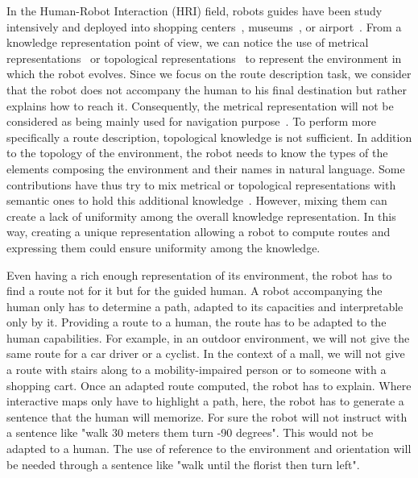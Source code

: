 In the Human-Robot Interaction (HRI) field, robots guides have been study intensively and deployed into shopping centers~\cite{okuno_2009_providing}, museums~\cite{burgard_1999_museum, clodic_2006_rackham, siegwart_2003_robox}, or airport~\cite{triebel_2016_spencer}. From a knowledge representation point of view, we can notice the use of metrical representations~\cite{thrun_2007_simultaneous} or topological representations~\cite{morales_2011_modeling} to represent the environment in which the robot evolves. Since we focus on the route description task, we consider that the robot does not accompany the human to his final destination but rather explains how to reach it. Consequently, the metrical representation will not be considered as being mainly used for navigation purpose~\cite{thrun_2007_simultaneous}. To perform more specifically a route description, topological knowledge is not sufficient. In addition to the topology of the environment, the robot needs to know the types of the elements composing the environment and their names in natural language. Some contributions have thus try to mix metrical or topological representations with semantic ones to hold this additional knowledge~\cite {satake_2015_should, chrastil_2014_cognitive, zender_2008_conceptual}. However, mixing them can create a lack of uniformity among the overall knowledge representation. In this way, creating a unique representation allowing a robot to compute routes and expressing them could ensure uniformity among the knowledge.

Even having a rich enough representation of its environment, the robot has to find a route not for it but for the guided human. A robot accompanying the human only has to determine a path, adapted to its capacities and interpretable only by it. Providing a route to a human, the route has to be adapted to the human capabilities. For example, in an outdoor environment, we will not give the same route for a car driver or a cyclist. In the context of a mall, we will not give a route with stairs along to a mobility-impaired person or to someone with a shopping cart. Once an adapted route computed, the robot has to explain. Where interactive maps only have to highlight a path, here, the robot has to generate a sentence that the human will memorize. For sure the robot will not instruct with a sentence like "walk 30 meters them turn -90 degrees". This would not be adapted to a human. The use of reference to the environment and orientation will be needed through a sentence like "walk until the florist then turn left".


